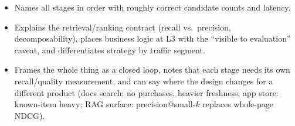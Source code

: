 \begin{interviewq}

\goodgreat
\begin{itemize}
    \item {} Names all stages in order with roughly correct candidate counts and latency.
    \item {} Explains the retrieval/ranking contract (recall vs.\ precision, decomposability), places business logic at L3 with the ``visible to evaluation'' caveat, and differentiates strategy by traffic segment.
    \item {} Frames the whole thing as a closed loop, notes that each stage needs its own recall/quality measurement, and can say where the design changes for a different product (docs search: no purchases, heavier freshness; app store: known-item heavy; RAG surface: precision@small-$k$ replaces whole-page NDCG).
\end{itemize}

\end{interviewq}


